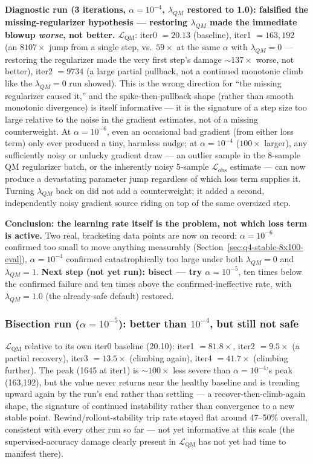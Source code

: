 \documentclass[11pt]{article}
\begin{document}
\textbf{Diagnostic run (3 iterations, $\alpha=10^{-4}$, $\lambda_{QM}$
restored to 1.0): falsified the missing-regularizer hypothesis --- restoring
$\lambda_{QM}$ made the immediate blowup \emph{worse}, not better.}
$\mathcal{L}_{\text{QM}}$: iter0 $=20.13$ (baseline), iter1 $=163{,}192$
(an $8107\times$ jump from a single step, vs.\ $59\times$ at the same
$\alpha$ with $\lambda_{QM}=0$ --- restoring the regularizer made the very
first step's damage $\sim\!137\times$ worse, not better), iter2 $=9734$
(a large partial pullback, not a continued monotonic climb like the
$\lambda_{QM}=0$ run showed). This is the wrong direction for ``the missing
regularizer caused it,'' and the spike-then-pullback shape (rather than
smooth monotonic divergence) is itself informative --- it is the signature
of a step size too large relative to the noise in the gradient estimates,
not of a missing counterweight. At $\alpha=10^{-6}$, even an occasional bad
gradient (from either loss term) only ever produced a tiny, harmless nudge;
at $\alpha=10^{-4}$ ($100\times$ larger), any sufficiently noisy or unlucky
gradient draw --- an outlier sample in the 8-sample QM regularizer batch, or
the inherently noisy 5-sample $\mathcal{L}_{\text{obs}}$ estimate --- can
now produce a devastating parameter jump regardless of which loss term
supplies it. Turning $\lambda_{QM}$ back on did not add a counterweight; it
added a second, independently noisy gradient source riding on top of the
same oversized step.

\textbf{Conclusion: the learning rate itself is the problem, not which loss
term is active.} Two real, bracketing data points are now on record:
$\alpha=10^{-6}$ confirmed too small to move anything measurably
(Section~\ref{sec:q4-stable-8x100-eval}), $\alpha=10^{-4}$ confirmed
catastrophically too large under both $\lambda_{QM}=0$ and $\lambda_{QM}=1$.
\textbf{Next step (not yet run): bisect --- try $\alpha=10^{-5}$}, ten times
below the confirmed failure and ten times above the confirmed-ineffective
rate, with $\lambda_{QM}=1.0$ (the already-safe default) restored.

\subsubsection{Bisection run ($\alpha=10^{-5}$): better than $10^{-4}$, but still not safe}
\label{sec:q4-stable-lr-bisect1}

$\mathcal{L}_{\text{QM}}$ relative to its own iter0 baseline (20.10): iter1
$=81.8\times$, iter2 $=9.5\times$ (a partial recovery), iter3
$=13.5\times$ (climbing again), iter4 $=41.7\times$ (climbing further). The
peak (1645 at iter1) is $\sim\!100\times$ less severe than
$\alpha=10^{-4}$'s peak (163{,}192), but the value never returns near the
healthy baseline and is trending upward again by the run's end rather than
settling --- a recover-then-climb-again shape, the signature of continued
instability rather than convergence to a new stable point.
Rewind/rollout-stability trip rate stayed flat around 47--50\% overall,
consistent with every other run so far --- not yet informative at this
scale (the supervised-accuracy damage clearly present in
$\mathcal{L}_{\text{QM}}$ has not yet had time to manifest there).
\end{document}
